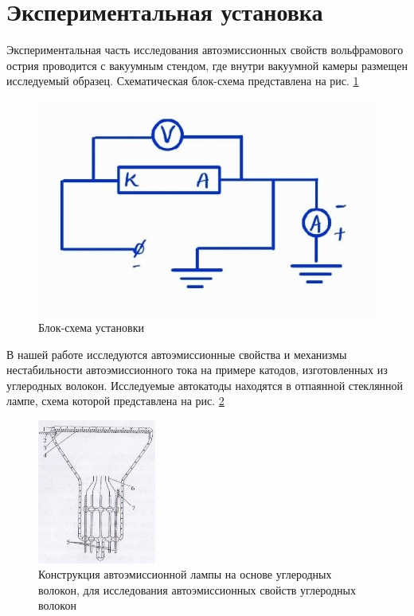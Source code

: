 \documentclass[12pt,a4paper]{article}
\begin{document}
\section{Экспериментальная установка}

Экспериментальная часть исследования автоэмиссионных свойств вольфрамового острия проводится с вакуумным стендом, где внутри вакуумной камеры размещен исследуемый образец. Схематическая блок-схема представлена на рис. \ref{ust}

\begin{figure}[H]
	\centering
	\includegraphics[scale=0.4]{sheme.jpg}
	\caption{Блок-схема установки}
	\label{ust}
\end{figure}

В нашей работе исследуются автоэмиссионные свойства и механизмы нестабильности автоэмиссионного тока на примере катодов, изготовленных из углеродных волокон. Исследуемые автокатоды находятся в отпаянной стеклянной лампе, схема которой представлена на рис. \ref{pic2}

\begin{figure}[H]
	\centering
	\includegraphics[width=110pt]{ust.jpg}
	\caption{Конструкция автоэмиссионной лампы на основе углеродных волокон, для исследования автоэмиссионных свойств углеродных волокон}
	\label{pic2}
\end{figure}
\end{document}
